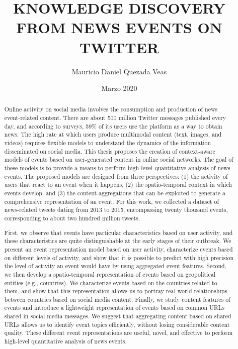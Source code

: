 \documentclass[upright, contnum]{umemoria}
\author{Mauricio Daniel Quezada Veas}
\title{\bf KNOWLEDGE DISCOVERY FROM NEWS EVENTS ON TWITTER}
\date{Marzo 2020}
\begin{document}
\frontmatter
\maketitle 

\begin{abstract} 

    Online activity on social media involves the consumption and production of
    news event-related content. 
    There are about 500 million Twitter messages published every day, and
    according to surveys, 59\% of its users use the platform as a way to obtain
    news. 
    The high rate at which users produce multimodal content (text, images, and
    videos) requires flexible models to understand the dynamics of the
    information disseminated on social media. 
    This thesis proposes the creation of context-aware models of events based on
    user-generated content in online social networks.
    The goal of these models is to provide a means to perform high-level
    quantitative analysis of news events. 
    The proposed models are designed from three perspectives: 
    (1) the activity of users that react to an event when it happens, 
    (2) the spatio-temporal context in which events develop, and 
    (3) the content aggregations that can be exploited to generate a
    comprehensive representation of an event. 
    For this work, we collected a dataset of news-related tweets dating from
    2013 to 2015, encompassing twenty thousand events, corresponding to about
    two hundred million tweets.

    First, we observe that events have particular characteristics based on user
    activity, and these characteristics are quite distinguishable at the early
    stages of their outbreak.
    We present an event representation model based on user activity,
    characterize events based on different levels of activity, and show that it
    is possible to predict with high precision the level of activity an event
    would have by using aggregated event features.
    Second, we then develop a spatio-temporal representation of events based on
    geopolitical entities (e.g., countries).
    We characterize events based on the countries related to them, and show that
    this representation allows us to portray real-world relationships between
    countries based on social media content.
    Finally, we study content features of events and introduce a lightweight
    representation of events based on common URLs shared in social media
    messages.
    We suggest that aggregating content based on shared URLs allows us to
    identify event topics efficiently, without losing considerable content
    quality.
    These different event representations are useful, novel, and effective to
    perform high-level quantitative analysis of news events.

\end{abstract}
\end{document}
